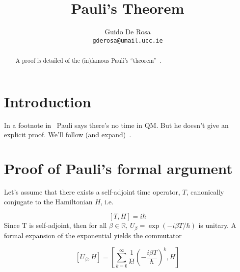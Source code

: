 \documentclass[a4paper,12pt]{article}
\author{Guido De Rosa \\ \small\tt{gderosa@umail.ucc.ie}}
\title{Pauli's Theorem}
\begin{document}
\maketitle

\begin{abstract}
A proof is detailed of the (in)famous Pauli's ``theorem''~\cite[footnote~2]{PauliFootnote}.
\end{abstract}

\section{Introduction}

In a footnote in~\cite{PauliFootnote} Pauli says there's no time in QM. But he
doesn't give an explicit proof. We'll follow (and expand)~\cite{Galapon2002}.

\section{Proof of Pauli's formal argument}\label{proof}

Let's assume that there exists a self-adjoint time operator, $T$, canonically conjugate
to the Hamiltonian $H$, i.e.

$$
[T, H] = i\hbar
$$
Since T is self-adjoint, then for all
$\beta\in\mathbb{R}$, $U_{\beta} = \exp(- i \beta T / \hbar)$
is unitary. A formal
expansion of the exponential yields the commutator

$$
[U_{\beta}, H] = 
\left[
    \sum_{k=0}^{\infty} \frac{1}{k!} \left(- \frac{i\beta T}{\hbar} \right)^k, H
\right]
$$



\end{document}
